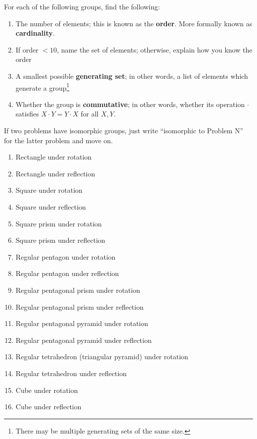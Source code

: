\documentclass[../gatm.tex]{subfiles}
\begin{document}
For each of the following groups, find the following:

\begin{enumerate}[label=(\alph*)]
\item The number of elements; this is known as the \textbf{order}. More formally known as \textbf{cardinality}.
\item If order $< 10$, name the set of elements; otherwise, explain how you know the order
\item A smallest possible \textbf{generating set}; in other words, a list of elements which generate a group\footnote{There may be multiple generating sets of the same size.}
\item Whether the group is \textbf{commutative}; in other words, whether its operation $\cdot$ satisfies $X\cdot Y=Y\cdot X$ for all $X,Y$.
\end{enumerate}

If two problems have isomorphic groups, just write ``isomorphic to Problem N'' for the latter problem and move on.

\begin{multicols}{2}
\begin{enumerate}
\setcounter{enumi}{\value{rrg_problem_i}}
\item Rectangle under rotation
\item Rectangle under reflection
\item Square under rotation
\item Square under reflection
\item Square prism under rotation
\item Square prism under reflection
\item Regular pentagon under rotation
\item Regular pentagon under reflection
\item Regular pentagonal prism under rotation
\item Regular pentagonal prism under reflection
\item Regular pentagonal pyramid under rotation
\item Regular pentagonal pyramid under reflection
\item Regular tetrahedron (triangular pyramid) under rotation
\item Regular tetrahedron under reflection
\item Cube under rotation
\item Cube under reflection
\end{enumerate}
\end{multicols}
\end{document}
